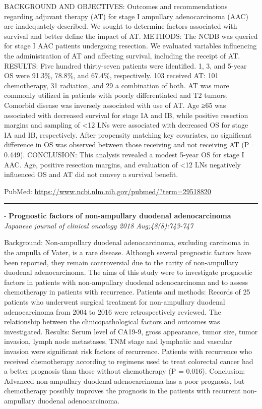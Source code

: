 \documentclass[]{article}
\begin{document}
BACKGROUND AND OBJECTIVES: Outcomes and recommendations regarding
adjuvant therapy (AT) for stage I ampullary adenocarcinoma (AAC) are
inadequately described. We sought to determine factors associated with
survival and better define the impact of AT. METHODS: The NCDB was
queried for stage I AAC patients undergoing resection. We evaluated
variables influencing the administration of AT and affecting survival,
including the receipt of AT. RESULTS: Five hundred thirty-seven patients
were identified. 1, 3, and 5-year OS were 91.3\%, 78.8\%, and 67.4\%,
respectively. 103 received AT: 101 chemotherapy, 31 radiation, and 29 a
combination of both. AT was more commonly utilized in patients with
poorly differentiated and T2 tumors. Comorbid disease was inversely
associated with use of AT. Age ≥65 was associated with decreased
survival for stage IA and IB, while positive resection margins and
sampling of \textless{}12 LNs were associated with decreased OS for
stage IA and IB, respectively. After propensity matching key covariates,
no significant difference in OS was observed between those receiving and
not receiving AT (P = 0.449). CONCLUSION: This analysis revealed a
modest 5-year OS for stage I AAC. Age, positive resection margins, and
evaluation of \textless{}12 LNs negatively influenced OS and AT did not
convey a survival benefit.

PubMed: \url{https://www.ncbi.nlm.nih.gov/pubmed/?term=29518820}

{}

{}

\begin{center}\rule{0.5\linewidth}{\linethickness}\end{center}

 - \textbf{Prognostic factors of non-ampullary duodenal adenocarcinoma}
\emph{Japanese journal of clinical oncology 2018 Aug;48(8):743-747}

Background: Non-ampullary duodenal adenocarcinoma, excluding carcinoma
in the ampulla of Vater, is a rare disease. Although several prognostic
factors have been reported, they remain controversial due to the rarity
of non-ampullary duodenal adenocarcinoma. The aims of this study were to
investigate prognostic factors in patients with non-ampullary duodenal
adenocarcinoma and to assess chemotherapy in patients with recurrence.
Patients and methods: Records of 25 patients who underwent surgical
treatment for non-ampullary duodenal adenocarcinoma from 2004 to 2016
were retrospectively reviewed. The relationship between the
clinicopathological factors and outcomes was investigated. Results:
Serum level of CA19-9, gross appearance, tumor size, tumor invasion,
lymph node metastases, TNM stage and lymphatic and vascular invasion
were significant risk factors of recurrence. Patients with recurrence
who received chemotherapy according to regimens used to treat colorectal
cancer had a better prognosis than those without chemotherapy (P =
0.016). Conclusion: Advanced non-ampullary duodenal adenocarcinoma has a
poor prognosis, but chemotherapy possibly improves the prognosis in the
patients with recurrent non-ampullary duodenal adenocarcinoma.
\end{document}
